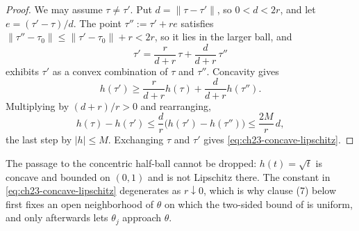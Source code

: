 \begin{proof}
We may assume $\tau\ne\tau'$.  Put $d=\|\tau-\tau'\|$, so $0<d<2r$, and
let $e=(\tau'-\tau)/d$.  The point $\tau'':=\tau'+re$ satisfies
$\|\tau''-\tau_0\|\leq\|\tau'-\tau_0\|+r<2r$, so it lies in the larger
ball, and
\[
 \tau'=\frac{r}{d+r}\,\tau+\frac{d}{d+r}\,\tau''
\]
exhibits $\tau'$ as a convex combination of $\tau$ and $\tau''$.
Concavity gives
\[
 h(\tau')\geq\frac{r}{d+r}h(\tau)+\frac{d}{d+r}h(\tau'').
\]
Multiplying by $(d+r)/r>0$ and rearranging,
\[
 h(\tau)-h(\tau')
  \leq\frac{d}{r}\bigl(h(\tau')-h(\tau'')\bigr)
 \leq\frac{2M}{r}\,d ,
\]
the last step by $|h|\leq M$.  Exchanging $\tau$ and $\tau'$ gives
\eqref{eq:ch23-concave-lipschitz}.
\end{proof}

\begin{remark}
\label{rem:ch23-concave-lipschitz-sharp}
The passage to the concentric half-ball cannot be dropped: $h(t)=\sqrt t$
is concave and bounded on $(0,1)$ and is not Lipschitz there.  The constant
in \eqref{eq:ch23-concave-lipschitz} degenerates as $r\downarrow0$, which
is why clause (7) below first fixes an open neighborhood of $\theta$ on
which the two-sided bound of  is uniform,
and only afterwards lets $\theta_j$ approach $\theta$.
\end{remark}

